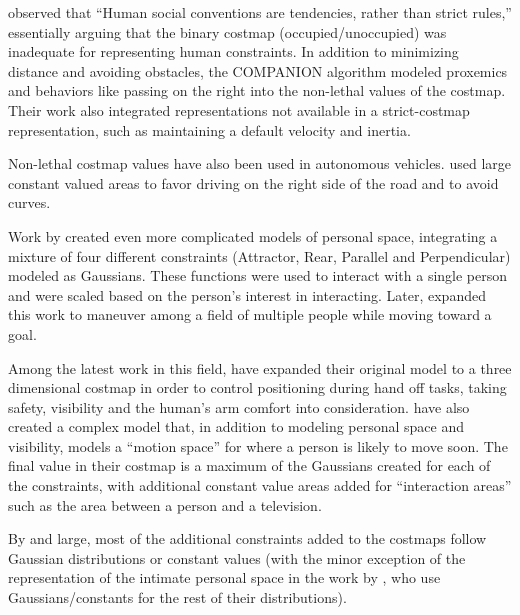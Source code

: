 \citet{kirby:companion} observed that ``Human social conventions are tendencies, rather than strict rules,'' essentially arguing that the binary costmap (occupied/unoccupied) was inadequate for representing human constraints. In addition to minimizing distance and avoiding obstacles, the COMPANION algorithm modeled proxemics and behaviors like passing on the right into the non-lethal values of the costmap. Their work also integrated representations not available in a strict-costmap representation, such as maintaining a default velocity and inertia. 

Non-lethal costmap values have also been used in autonomous vehicles. \citet{likhachev:costmaps} used large constant valued areas to favor driving on the right side of the road and to avoid curves. 

Work by \citet{svenstrup2009} created even more complicated models of personal space, integrating a mixture of four different constraints (Attractor, Rear, Parallel and Perpendicular) modeled as Gaussians. These functions were used to interact with a single person and were scaled based on the person's interest in interacting. Later, \citet{svenstrup2010} expanded this work to maneuver among a field of multiple people while moving toward a goal. 

Among the latest work in this field, \citet{sisbot2011} have expanded their original model to a three dimensional costmap in order to control positioning during hand off tasks, taking safety, visibility and the human's arm comfort into consideration. \citet{fraichard:anthronav} have also created a complex model that, in addition to modeling personal space and visibility, models a ``motion space'' for where a person is likely to move soon. The final value in their costmap is a maximum of the Gaussians created for each of the constraints, with additional constant value areas added for ``interaction areas'' such as the area between a person and a television. 

By and large, most of the additional constraints added to the costmaps follow Gaussian distributions or constant values (with the minor exception of the representation of the intimate personal space in the work by \citet{fraichard:anthronav}, who use Gaussians/constants for the rest of their distributions). 







